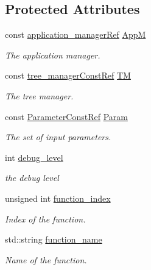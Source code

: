 \subsection*{Protected Attributes}
\begin{DoxyCompactItemize}
\item 
const \hyperlink{application__manager_8hpp_a04ccad4e5ee401e8934306672082c180}{application\+\_\+manager\+Ref} \hyperlink{classBehavioralHelper_a5709449513c415e3f005344f354e6760}{AppM}
\begin{DoxyCompactList}\small\item\em The application manager. \end{DoxyCompactList}\item 
const \hyperlink{tree__manager_8hpp_a792e3f1f892d7d997a8d8a4a12e39346}{tree\+\_\+manager\+Const\+Ref} \hyperlink{classBehavioralHelper_aea1d8a15b0b7ca8e52b16d47c261be74}{TM}
\begin{DoxyCompactList}\small\item\em The tree manager. \end{DoxyCompactList}\item 
const \hyperlink{Parameter_8hpp_a37841774a6fcb479b597fdf8955eb4ea}{Parameter\+Const\+Ref} \hyperlink{classBehavioralHelper_af202517b539f4631f4c35c2329692ea2}{Param}
\begin{DoxyCompactList}\small\item\em The set of input parameters. \end{DoxyCompactList}\item 
int \hyperlink{classBehavioralHelper_a4b82310260e0b6adc2982298ebd8b006}{debug\+\_\+level}
\begin{DoxyCompactList}\small\item\em the debug level \end{DoxyCompactList}\item 
unsigned int \hyperlink{classBehavioralHelper_a8af7afb9fea52822de958349b360a224}{function\+\_\+index}
\begin{DoxyCompactList}\small\item\em Index of the function. \end{DoxyCompactList}\item 
std\+::string \hyperlink{classBehavioralHelper_a2586d1f88fdf66d62ce3ac6acdd72f12}{function\+\_\+name}
\begin{DoxyCompactList}\small\item\em Name of the function. \end{DoxyCompactList}\item 

\end{DoxyCompactItemize}
